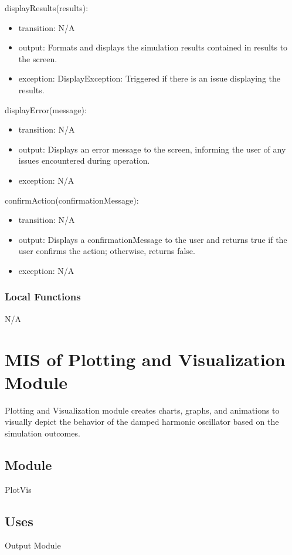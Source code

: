 \documentclass[12pt, titlepage]{article}
\begin{document}
\noindent displayResults(results):
\begin{itemize}
\item transition: N/A
\item output: Formats and displays the simulation results contained in results to the screen.
\item exception: DisplayException: Triggered if there is an issue displaying the results.
\end{itemize}

\noindent displayError(message):
\begin{itemize}
\item transition: N/A
\item output: Displays an error message to the screen, informing the user of any issues encountered during operation.
\item exception: N/A
\end{itemize}

\noindent confirmAction(confirmationMessage):
\begin{itemize}
\item transition: N/A
\item output: Displays a confirmationMessage to the user and returns true if the user confirms the action; otherwise, returns false.
\item exception: N/A
\end{itemize}

\subsubsection{Local Functions}
N/A



\section{MIS of Plotting and Visualization Module} \label{mPVM}

Plotting and Visualization module creates charts, graphs, and animations to visually depict the behavior of the
damped harmonic oscillator based on the simulation outcomes.

\subsection{Module}
PlotVis

\subsection{Uses}
Output Module
\end{document}
